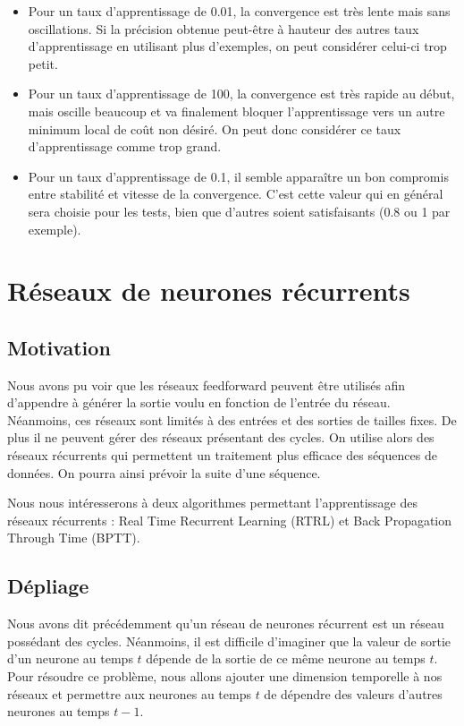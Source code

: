 \documentclass{report}
\theoremstyle{plain}
\theoremstyle{definition}
\theoremstyle{remark}
\begin{document}
\begin{itemize}

\item Pour un taux d'apprentissage de 0.01, la convergence est très lente mais sans oscillations. Si la précision obtenue peut-être à hauteur des autres taux d'apprentissage en utilisant plus d'exemples, on peut considérer celui-ci trop petit.
\item Pour un taux d'apprentissage de 100, la convergence est très rapide au début, mais oscille beaucoup et va finalement bloquer l'apprentissage vers un autre minimum local de coût non désiré. On peut donc considérer ce taux d'apprentissage comme trop grand.
\item Pour un taux d'apprentissage de 0.1, il semble apparaître un bon compromis entre stabilité et vitesse de la convergence. C'est cette valeur qui en général sera choisie pour les tests, bien que d'autres soient satisfaisants (0.8 ou 1 par exemple).

\end{itemize}

\chapter{Réseaux de neurones récurrents}
\section{Motivation}
Nous avons pu voir que les réseaux feedforward peuvent être utilisés afin d'appendre à générer la sortie voulu en fonction de l'entrée du réseau. 
Néanmoins, ces réseaux sont limités à des entrées et des sorties de tailles fixes. De plus il ne peuvent gérer des réseaux présentant des cycles. On utilise alors des réseaux récurrents qui permettent un traitement plus efficace des séquences de données. On pourra ainsi prévoir la suite d'une séquence.

Nous nous intéresserons à deux algorithmes permettant l'apprentissage des réseaux récurrents : Real Time Recurrent Learning (RTRL) et Back Propagation Through Time (BPTT).

\section{Dépliage}

Nous avons dit précédemment qu'un réseau de neurones récurrent est un réseau possédant des cycles. Néanmoins, il est difficile d'imaginer que la valeur de sortie d'un neurone au temps $t$ dépende de la sortie de ce même neurone au temps $t$. Pour résoudre ce problème, nous allons ajouter une dimension temporelle à nos réseaux et permettre aux neurones au temps $t$ de dépendre des valeurs d'autres neurones au temps $t-1$.
\end{document}
